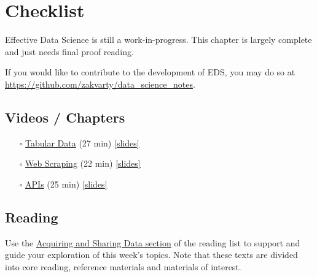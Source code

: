\documentclass[
  12pt,
]{book}
\begin{document}
\hypertarget{data-checklist}{%
\chapter*{Checklist}\label{data-checklist}}

Effective Data Science is still a work-in-progress. This chapter is largely complete and just needs final proof reading.

If you would like to contribute to the development of EDS, you may do so at \url{https://github.com/zakvarty/data_science_notes}.

\hypertarget{videos-chapters-1}{%
\section*{Videos / Chapters}\label{videos-chapters-1}}

\begin{itemize}
\item[$\square$]
  \href{https://imperial.cloud.panopto.eu/Panopto/Pages/Viewer.aspx?id=d80e9045-22e7-4a0e-a0fc-af8100d3e727}{Tabular Data} (27 min) \href{https://github.com/zakvarty/effective-data-science-slides-2022/raw/main/02-01-tabular-data-and-csvs/02-01-tabular-data.pdf}{{[}slides{]}}
\item[$\square$]
  \href{https://imperial.cloud.panopto.eu/Panopto/Pages/Viewer.aspx?id=239ba39e-8a06-4e7b-a6c1-af7200f91d2b}{Web Scraping} (22 min) \href{https://github.com/zakvarty/effective-data-science-slides-2022/raw/main/02-02-webscraping/02-02-web-scraping.pdf}{{[}slides{]}}
\item[$\square$]
  \href{https://imperial.cloud.panopto.eu/Panopto/Pages/Viewer.aspx?id=e1ed8e4f-cbaa-40c2-8c44-af7200ee2e9f}{APIs} (25 min) \href{https://github.com/zakvarty/effective-data-science-slides-2022/raw/main/02-03-apis/02-03-apis.pdf}{{[}slides{]}}
\end{itemize}

\hypertarget{reading-1}{%
\section*{Reading}\label{reading-1}}

Use the \protect\hyperlink{data-reading}{Acquiring and Sharing Data section} of the reading list to support and guide your exploration of this week's topics. Note that these texts are divided into core reading, reference materials and materials of interest.
\end{document}
